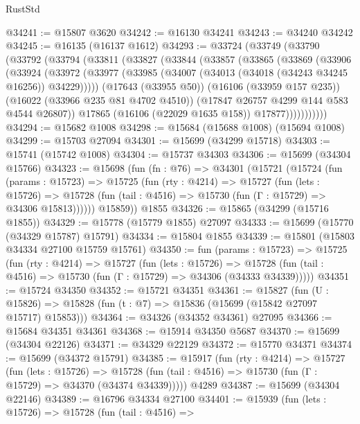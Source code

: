 \begin{lexlean}{RustStd}
\begin{coremodule}
@34241 := @15807 @3620
@34242 := @16130 @34241
@34243 := @34240 @34242
@34245 := @16135 (@16137 @1612)
@34293 := @33724
    (@33749
      (@33790
        (@33792
          (@33794
            (@33811
              (@33827
                (@33844
                  (@33857
                    (@33865
                      (@33869
                        (@33906
                          (@33924
                            (@33972
                              (@33977
                                (@33985 (@34007 (@34013 (@34018 (@34243 @34245 @16256)) @34229)))))
                            (@17643 (@33955 @50))
                            (@16106 (@33959 @157 @235))
                            (@16022 (@33966 @235 @81 @4702 @4510))
                            (@17847 @26757 @4299 @144 @583 @4544 @26807))
                          @17865
                          (@16106 (@22029 @1635 @158))
                          @17877)))))))))))
@34294 := @15682 @1008
@34298 := @15684 (@15688 @1008) (@15694 @1008)
@34299 := @15703 @27094
@34301 := @15699 (@34299 @15718)
@34303 := @15741 (@15742 @1008)
@34304 := @15737 @34303
@34306 := @15699 (@34304 @15766)
@34323 := @15698
    (fun (fn : @76) =>
    @34301
      (@15721
        (@15724
          (fun (params : @15723) =>
          @15725
            (fun (rty : @4214) =>
            @15727
              (fun (lets : @15726) =>
              @15728 (fun (tail : @4516) => @15730 (fun (Γ : @15729) => @34306 @15813))))))
        @15859))
    @1855
@34326 := @15865 (@34299 (@15716 @1855))
@34329 := @15778 (@15779 @1855) @27097
@34333 := @15699 (@15770 (@34329 @15787) @15791)
@34334 := @15804 @1855
@34339 := @15801 (@15803 @34334 @27100 @15759 @15761)
@34350 := fun (params : @15723) =>
  @15725
    (fun (rty : @4214) =>
    @15727
      (fun (lets : @15726) =>
      @15728 (fun (tail : @4516) => @15730 (fun (Γ : @15729) => @34306 (@34333 @34339)))))
@34351 := @15724 @34350
@34352 := @15721 @34351
@34361 := @15827
    (fun (U : @15826) => @15828 (fun (t : @7) => @15836 (@15699 (@15842 @27097 @15717) @15853)))
@34364 := @34326 (@34352 @34361) @27095
@34366 := @15684 @34351 @34361
@34368 := @15914 @34350 @5687
@34370 := @15699 (@34304 @22126)
@34371 := @34329 @22129
@34372 := @15770 @34371
@34374 := @15699 (@34372 @15791)
@34385 := @15917
    (fun (rty : @4214) =>
    @15727
      (fun (lets : @15726) =>
      @15728 (fun (tail : @4516) => @15730 (fun (Γ : @15729) => @34370 (@34374 @34339)))))
    @4289
@34387 := @15699 (@34304 @22146)
@34389 := @16796 @34334 @27100
@34401 := @15939
    (fun (lets : @15726) =>
    @15728
      (fun (tail : @4516) =>

\end{coremodule}
\end{lexlean}
